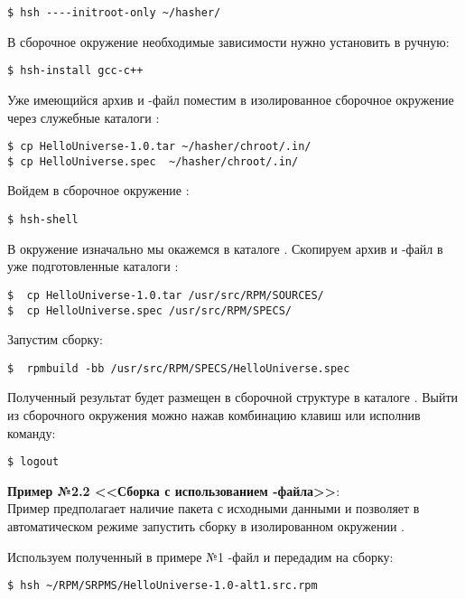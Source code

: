 \begin{verbatim}
$ hsh ----initroot-only ~/hasher/
\end{verbatim}

В сборочное окружение необходимые зависимости нужно установить в ручную:
\begin{verbatim}
$ hsh-install gcc-c++
\end{verbatim}

Уже имеющийся архив и -файл поместим в изолированное сборочное
окружение через служебные каталоги :

\begin{verbatim}
$ cp HelloUniverse-1.0.tar ~/hasher/chroot/.in/
$ cp HelloUniverse.spec  ~/hasher/chroot/.in/
\end{verbatim}

Войдем в сборочное окружение :
\begin{verbatim}
$ hsh-shell
\end{verbatim}

В окружение  изначально мы окажемся в каталоге .
Скопируем архив и -файл в уже подготовленные каталоги :
\begin{verbatim}
$  cp HelloUniverse-1.0.tar /usr/src/RPM/SOURCES/
$  cp HelloUniverse.spec /usr/src/RPM/SPECS/
\end{verbatim}

Запустим сборку:
\begin{verbatim}
$  rpmbuild -bb /usr/src/RPM/SPECS/HelloUniverse.spec
\end{verbatim}

Полученный результат будет размещен в сборочной структуре 
в каталоге . Выйти из сборочного окружения можно
нажав комбинацию клавиш  или исполнив команду:
\begin{verbatim}
$ logout
\end{verbatim}

\textbf{Пример №2.2 <<Сборка с использованием -файла>>}:\\

Пример предполагает наличие пакета с исходными данными  и
позволяет в автоматическом режиме запустить сборку в изолированном окружении
.

Используем полученный в примере №1 -файл и передадим на сборку:
\begin{verbatim}
$ hsh ~/RPM/SRPMS/HelloUniverse-1.0-alt1.src.rpm
\end{verbatim}

